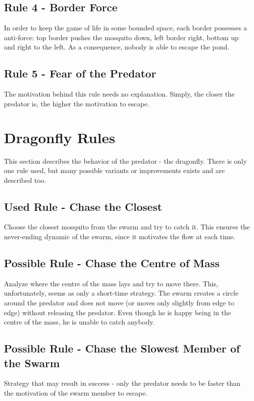 \documentclass{article}
\begin{document}
\subsection{Rule 4 - Border Force}
In order to keep the game of life in some bounded space, each border possesses
a anti-force: top border pushes the mosquito down, left border right, bottom up
and right to the left. As a consequence, nobody is able to escape the pond.
\subsection{Rule 5 - Fear of the Predator}
The motivation behind this rule needs no explanation. Simply, the closer the
predator is, the higher the motivation to escape.

\section{Dragonfly Rules} This section describes the behavior of the predator -
the dragonfly. There is only one rule used, but many possible variants or
improvements exists and are described too.
\subsection{Used Rule - Chase the Closest}
Choose the closest mosquito from the swarm and try to catch it. This ensures
the never-ending dynamic of the swarm, since it motivates the flow at each
time.
\subsection{Possible Rule - Chase the Centre of Mass}
Analyze where the centre of the mass lays and try to move there. This,
unfortunately, seems as only a short-time strategy. The swarm creates a circle
around the predator and does not move (or moves only slightly from edge to
edge) without releasing the predator. Even though he is happy being in the
centre of the mass, he is unable to catch anybody.

\subsection{Possible Rule - Chase the Slowest Member of the Swarm}
Strategy that may result in success - only the predator needs to be faster than
the motivation of the swarm member to escape.
\end{document}
